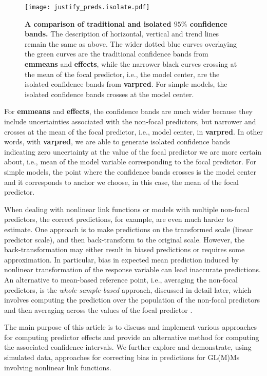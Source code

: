 \documentclass[10pt,letterpaper]{article}
\newcommand{\pkg}[1]{\textbf{#1}}
\begin{document}
\begin{figure}[!h]
\centering
\texttt{[image: justify\_preds.isolate.pdf]}
\caption{{\bf A comparison of traditional and isolated $95\%$ confidence bands.} The description of horizontal, vertical and trend lines remain the same as above. The wider dotted blue curves overlaying the green curves are the traditional confidence bands from \pkg{emmeans} and \pkg{effects}, while the narrower black curves crossing at the mean of the focal predictor, i.e., the model center, are the isolated confidence bands from \pkg{varpred}. For simple models, the isolated confidence bands crosses at the model center.}
\label{fig:justify_ci_plots}
\end{figure}

For \pkg{emmeans} and \pkg{effects}, the confidence bands are much wider because they include uncertainties associated with the non-focal predictors, but narrower and crosses at the mean of the focal predictor, i.e., model center, in \pkg{varpred}. In other words, with \pkg{varpred}, we are able to generate isolated confidence bands indicating zero uncertainty at the value of the focal predictor we are more certain about, i.e., mean of the model variable corresponding to the focal predictor. For simple models, the point where the confidence bands crosses is the model center and it corresponds to anchor we choose, in this case, the mean of the focal predictor.


When dealing with nonlinear link functions or models with multiple non-focal predictors, the correct predictions, for example, are even much harder to estimate. One approach is to make predictions on the transformed scale (linear predictor scale), and then back-transform to the original scale. However, the back-transformation may either result in biased predictions or requires some approximation. In particular, bias in expected mean prediction induced by nonlinear transformation of the response variable can lead inaccurate predictions. An alternative to mean-based reference point, i.e., averaging the non-focal predictors, is the \emph{whole-sample-based} approach, discussed in detail later, which involves computing the prediction over the population of the non-focal predictors and then averaging across the values of the focal predictor \cite{hanmer2013behind}. 


The main purpose of this article is to discuss and implement various approaches for computing predictor effects and provide an alternative method for computing the associated confidence intervals. We further explore and demonstrate, using simulated data, approaches for correcting bias in predictions for GL(M)Ms involving nonlinear link functions.
\end{document}
